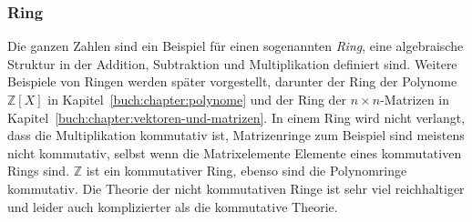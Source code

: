\subsubsection{Ring}
%
Die ganzen Zahlen sind ein Beispiel für einen sogenannten {\em Ring},
%
eine algebraische Struktur in der Addition, Subtraktion und
Multiplikation definiert sind.
Weitere Beispiele von Ringen werden später vorgestellt,
darunter
der Ring der Polynome $\mathbb{Z}[X]$ in Kapitel~\ref{buch:chapter:polynome}
%
und
der Ring der $n\times n$-Matrizen in
%
Kapitel~\ref{buch:chapter:vektoren-und-matrizen}.
In einem Ring wird nicht verlangt, dass die Multiplikation kommutativ
ist, Matrizenringe zum Beispiel sind meistens nicht kommutativ, selbst
wenn die Matrixelemente Elemente eines kommutativen Rings sind.
$\mathbb{Z}$ ist ein kommutativer Ring, ebenso sind die Polynomringe 
kommutativ.
Die Theorie der nicht kommutativen Ringe ist sehr viel reichhaltiger
und leider auch komplizierter als die kommutative Theorie.
%





